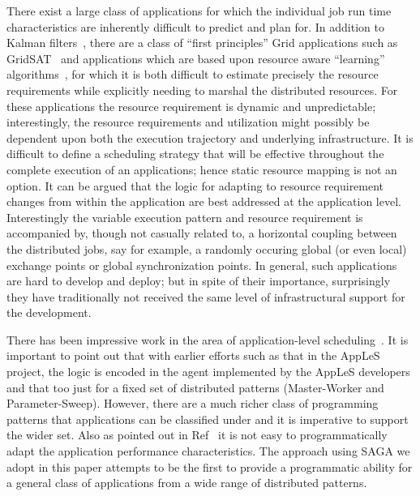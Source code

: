 \documentclass[conference,final]{IEEEtran}
\begin{document}
There exist a large class of applications for which the individual job
run time characteristics are inherently difficult to predict and plan
for.  In addition to Kalman filters~\cite{DataAssim, KalmanPaper},
there are a class of ``first principles'' Grid applications such as
GridSAT~\cite{gridsat03} and applications which are based upon
resource aware ``learning'' algorithms~\cite{ majority_voting}, for
which it is both difficult to estimate precisely the resource
requirements while explicitly needing to marshal the distributed
resources. For these applications the resource requirement is dynamic
and unpredictable; interestingly, the resource requirements and
utilization might possibly be dependent upon both the execution
trajectory and underlying infrastructure.  It is difficult to define a
scheduling strategy that will be effective throughout the complete
execution of an applications; hence static resource mapping is not an
option.  It can be argued that the logic for adapting to resource
requirement changes from within the application are best addressed at
the application level.  Interestingly the variable execution pattern
and resource requirement is accompanied by, though not casually
related to, a horizontal coupling between the distributed jobs, say
for example, a randomly occuring global (or even local) exchange
points or global synchronization points.  In general, such
applications are hard to develop and deploy; but in spite of their
importance, surprisingly they have traditionally not received the same
level of infrastructural support for the development.



There has been impressive work in the area of application-level
scheduling~\cite{cactusworm, apples03}. It is important to point out
that with earlier efforts such as that in the AppLeS project, the
logic is encoded in the agent implemented by the AppLeS developers and
that too just for a fixed set of distributed patterns (Master-Worker
and Parameter-Sweep).  However, there are a much richer class of
programming patterns that applications can be classified under and it
is imperative to support the wider set. Also as pointed out in
Ref~\cite{apples03} it is not easy to programmatically adapt the
application performance characteristics. The approach using SAGA we
adopt in this paper attempts to be the first to provide a programmatic
ability for a general class of applications from a wide range of
distributed patterns.
\end{document}
